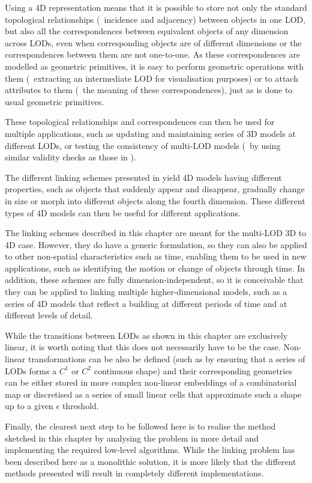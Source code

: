 Using a 4D representation means that it is possible to store not only the standard topological relationships (\eg\ incidence and adjacency) between objects in one LOD, but also all the correspondences between equivalent objects of any dimension across LODs, even when corresponding objects are of different dimensions or the correspondences between them are not one-to-one.
As these correspondences are modelled as geometric primitives, it is easy to perform geometric operations with them (\eg\ extracting an intermediate LOD for visualisation purposes) or to attach attributes to them (\eg\ the meaning of these correspondences), just as is done to usual geometric primitives.

These topological relationships and correspondences can then be used for multiple applications, such as updating and maintaining series of 3D models at different LODs, or testing the consistency of multi-LOD models (\eg\ by using similar validity checks as those in \citet{Groger11}).

The different linking schemes presented in  yield 4D models having different properties, such as objects that suddenly appear and disappear, gradually change in size or morph into different objects along the fourth dimension.
These different types of 4D models can then be useful for different applications.

The linking schemes described in this chapter are meant for the multi-LOD 3D to 4D case.
However, they do have a generic formulation, so they can also be applied to other non-spatial characteristics such as time, enabling them to be used in new applications, such as identifying the motion or change of objects through time.
In addition, these schemes are fully dimension-independent, so it is conceivable that they can be applied to linking multiple higher-dimensional models, such as a series of 4D models that reflect a building at different periods of time and at different levels of detail.

While the transitions between LODs as shown in this chapter are exclusively linear, it is worth noting that this does not necessarily have to be the case.
Non-linear transformations can be also be defined (such as by ensuring that a series of LODs forms a $C^1$ or $C^2$ continuous shape) and their corresponding geometries can be either stored in more complex non-linear embeddings of a combinatorial map or discretised as a series of small linear cells that approximate such a shape up to a given $\epsilon$ threshold.

Finally, the clearest next step to be followed here is to realise the method sketched in this chapter by analysing the problem in more detail and implementing the required low-level algorithms.
While the linking problem has been described here as a monolithic solution, it is more likely that the different methods presented will result in completely different implementations.
